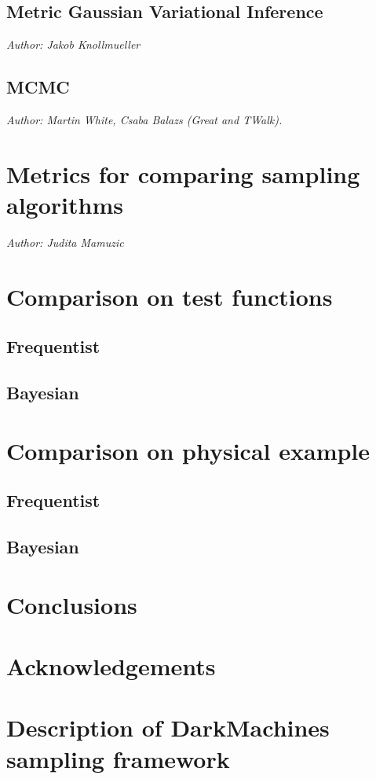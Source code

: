 \documentclass[12pt]{JHEP3}
\begin{document}
\subsection{Metric Gaussian Variational Inference}
\emph{Author: Jakob Knollmueller}

\subsection{MCMC}

\emph{Author: Martin White, Csaba Balazs (Great and TWalk).} 

\section{Metrics for comparing sampling algorithms}
\label{sec:metrics}
\emph{Author: Judita Mamuzic}

\section{Comparison on test functions}
\label{sec:test}
\subsection{Frequentist}
\subsection{Bayesian}

\section{Comparison on physical example}
\label{sec:physics}
\subsection{Frequentist}
\subsection{Bayesian}

\section{Conclusions}\label{Conclusions}
\label{sec:conclusions}
\section{Acknowledgements}



\appendix
\section{Description of DarkMachines sampling framework}
\label{app:python}
\end{document}
